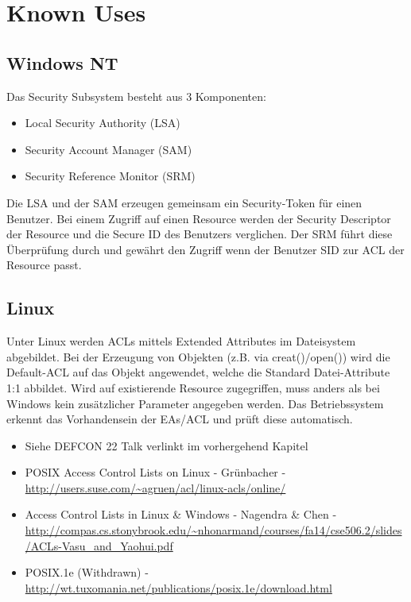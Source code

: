 \section{Known Uses}
\subsection{Windows NT}
Das Security Subsystem besteht aus 3 Komponenten:
\begin{itemize}
    \item Local Security Authority (LSA)
    \item Security Account Manager (SAM)
    \item Security Reference Monitor (SRM)
\end{itemize}
Die LSA und der SAM erzeugen gemeinsam ein Security-Token für einen Benutzer. Bei einem Zugriff auf einen Resource werden der Security Descriptor der Resource und die Secure ID des Benutzers verglichen. Der SRM führt diese Überprüfung durch und gewährt den Zugriff wenn der Benutzer SID zur ACL der Resource passt.

\subsection{Linux}
Unter Linux werden ACLs mittels Extended Attributes im Dateisystem abgebildet. Bei der Erzeugung von Objekten (z.B. via creat()/open()) wird die Default-ACL auf das Objekt angewendet, welche die Standard Datei-Attribute 1:1 abbildet. Wird auf existierende Resource zugegriffen, muss anders als bei Windows kein zusätzlicher Parameter angegeben werden. Das Betriebssystem erkennt das Vorhandensein der EAs/ACL und prüft diese automatisch.
\\
\begin{additional}[Links]
  \begin{itemize}
      \item Siehe DEFCON 22 Talk verlinkt im vorhergehend Kapitel
      \item POSIX Access Control Lists on Linux - Grünbacher - \url{http://users.suse.com/~agruen/acl/linux-acls/online/}
      \item Access Control Lists in Linux \& Windows - Nagendra \& Chen - \url{http://compas.cs.stonybrook.edu/~nhonarmand/courses/fa14/cse506.2/slides/ACLs-Vasu_and_Yaohui.pdf}
      \item POSIX.1e (Withdrawn) - \url{http://wt.tuxomania.net/publications/posix.1e/download.html}
  \end{itemize}
\end{additional}

